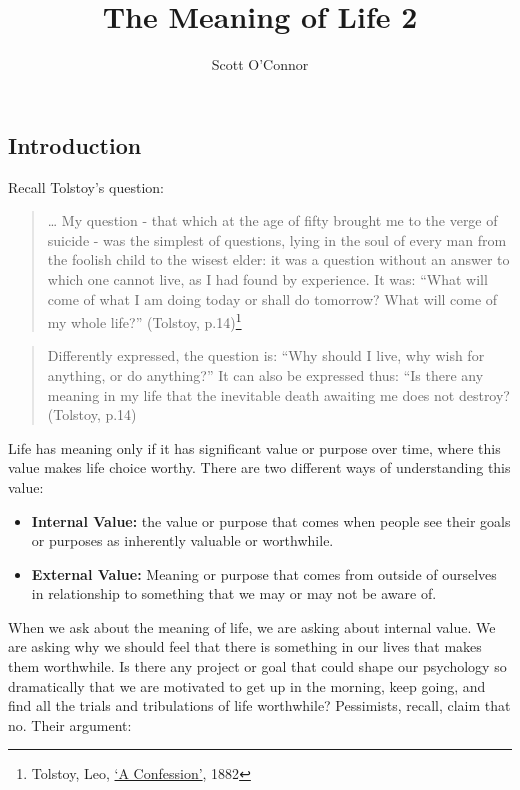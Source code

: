 \documentclass[]{article}
\title{The Meaning of Life 2}
\author{Scott O’Connor}
\begin{document}
\maketitle

\subsection{Introduction}\label{introduction}

Recall Tolstoy's question:

\begin{quote}
\ldots{} My question - that which at the age of fifty brought me to the
verge of suicide - was the simplest of questions, lying in the soul of
every man from the foolish child to the wisest elder: it was a question
without an answer to which one cannot live, as I had found by
experience. It was: ``What will come of what I am doing today or shall
do tomorrow? What will come of my whole life?'' (Tolstoy, p.14)\footnote{Tolstoy, Leo, \href{/Teaching/Examined/Meaning/Tolstoy.pdf}{`A
  Confession'}, 1882}
\end{quote}

\begin{quote}
Differently expressed, the question is: ``Why should I live, why wish
for anything, or do anything?'' It can also be expressed thus: ``Is
there any meaning in my life that the inevitable death awaiting me does
not destroy? (Tolstoy, p.14)
\end{quote}

Life has meaning only if it has significant value or purpose over time,
where this value makes life choice worthy. There are two different ways
of understanding this value:

\begin{itemize}
\item
  \textbf{Internal Value:} the value or purpose that comes when people
  see their goals or purposes as inherently valuable or worthwhile.
\item
  \textbf{External Value:} Meaning or purpose that comes from outside of
  ourselves in relationship to something that we may or may not be aware
  of.
\end{itemize}

When we ask about the meaning of life, we are asking about internal
value. We are asking why we should feel that there is something in our
lives that makes them worthwhile. Is there any project or goal that
could shape our psychology so dramatically that we are motivated to get up in the morning, keep going,
and find all the trials and tribulations of life worthwhile? Pessimists, recall, claim that no. Their
argument:
\end{document}
